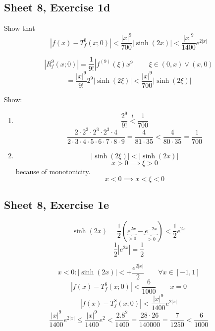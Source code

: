 \documentclass{article}
\newcommand{\card}[1]{\left|#1\right|}
\begin{document}
\subsection{Sheet 8, Exercise 1d}
Show that
\[ \card{f(x) - T_f^8(x; 0)} < \frac{\card{x}^9}{700} \card{\operatorname{sinh}(2x)} < \frac{\card{x}^9}{1400} e^{2 \card{x}} \]

\[ \card{R_f^9(x; 0)} = \frac{1}{9!} \card{f^{(9)}(\xi) x^9} \qquad \xi \in (0, x) \lor (x, 0) \]
\[ = \frac{\card{x}^9}{9!} 2^9 \card{\operatorname{sinh}(2\xi)} < \frac{\card{x}^9}{700} \card{\operatorname{sinh}(2\xi)} \]

Show:
\begin{enumerate}
  \item \[ \frac{2^9}{9!} \overset!< \frac{1}{700} \]
    \[ \frac{2 \cdot 2^2 \cdot 2^3 \cdot 2^3 \cdot 4}{2 \cdot 3 \cdot 4 \cdot 5 \cdot 6 \cdot 7 \cdot 8 \cdot 9} = \frac{4}{81 \cdot 35} < \frac{4}{80 \cdot 35} = \frac1{700} \]
  \item \[ \card{\operatorname{sinh}(2\xi)} < \card{\operatorname{sinh}(2x)}  \]
    \[ x > 0 \implies \xi > 0 \]
    because of monotonicity.
    \[ x < 0 \implies x < \xi < 0 \]
\end{enumerate}

\subsection{Sheet 8, Exercise 1e}
\[ \operatorname{sinh}(2x) = \frac12 (\underbrace{e^{2x}}_{>0} - \underbrace{e^{-2x}}_{> 0}) < \frac12 e^{2x} \]
\[ \frac12 \card{e^{2x}} = \frac12 \]

\[ x < 0: \card{\operatorname{sinh}(2x)} < + \frac{e^{2\card{x}}}{2} \qquad \forall x \in [-1,1] \]
\[ \card{f(x) - T_f^8(x; 0)} < \frac{6}{1000} \qquad x = 0 \]
\[ \card{f(x) - T_f^8(x; 0)} < \frac{\card{x}^9}{1400} e^{2 \card{x}} \]
\[ \frac{\card{x}^9}{1400} e^{2 \card{x}} \leq \frac{\card{x}^9}{1400} e^2 < \frac{2.8^2}{1400} = \frac{28 \cdot 26}{140000} = \frac{7}{1250} < \frac{6}{1000} \]
\end{document}
